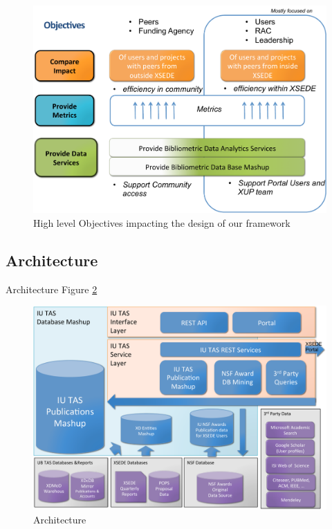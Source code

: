 \documentclass{sig-alternate}
\begin{document}
\begin{figure}[htb] 
  \centering 
    \includegraphics[width=1.0\columnwidth]{images-new/objectives.pdf} 
    \caption{High level Objectives impacting the design of our framework}
    \label{F:objectives}
\end{figure} 


\subsection{Architecture}

Architecture Figure \ref{F:architecture} 

\begin{figure}[htb] 
  \centering 
    \includegraphics[width=1.0\columnwidth]{images-new/architecture.pdf} 
  \caption{Architecture}\label{F:architecture} 
\end{figure} 
\end{document}
